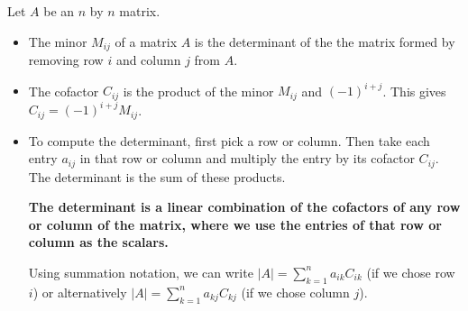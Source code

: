 \begin{definition}\label{general determinants}
Let {$A$} be an $n$ by $n$ matrix. 
\begin{itemize}
 \item The minor {$M_{ij}$} of a matrix {$A$} is the determinant of the the matrix formed by removing row {$i$} and column {$j$} from {$A$}. 
 \item 
{}%
The cofactor $C_{ij}$ is the product of the minor $M_{ij}$ and $(-1)^{i+j}$. This gives $C_{ij} = (-1)^{i+j}M_{ij}$.
 \item To compute the determinant, first pick a row or column.
Then take each entry $a_{ij}$ in that row or column and multiply the entry by its cofactor $C_{ij}$. The determinant is the sum of these products. 

{\bf The determinant is a linear combination of the cofactors of any row or column of the matrix, where we use the entries of that row or column as the scalars.  }

Using summation notation, we can write $|A| = \sum_{k=1}^n a_{ik}C_{ik}$ (if we chose row $i$) or alternatively $|A| = \sum_{k=1}^n a_{kj}C_{kj}$ (if we chose column $j$).  
\end{itemize}
\end{definition}




